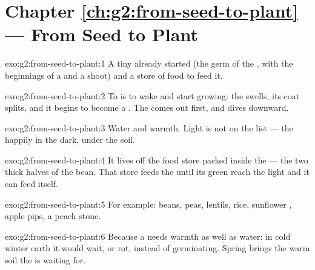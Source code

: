 \section*{Chapter \ref{ch:g2:from-seed-to-plant} --- From Seed to Plant}

\begin{solution}{exo:g2:from-seed-to-plant:1}
A tiny  already started (the germ of the , with the
beginnings of a  and a shoot) and a store of food to feed it.
\end{solution}

\begin{solution}{exo:g2:from-seed-to-plant:2}
To  is to wake and start growing: the  swells, its
coat splits, and it begins to become a . The  comes out
first, and dives downward.
\end{solution}

\begin{solution}{exo:g2:from-seed-to-plant:3}
Water and warmth. Light is not on the list --- the  
happily in the dark, under the soil.
\end{solution}

\begin{solution}{exo:g2:from-seed-to-plant:4}
It lives off the food store packed inside the  --- the two
thick halves of the bean. That store feeds the  until its
green  reach the light and it can feed itself.
\end{solution}

\begin{solution}{exo:g2:from-seed-to-plant:5}
For example: beans, peas, lentils, rice, sunflower , apple
pips, a peach stone.
\end{solution}

\begin{solution}{exo:g2:from-seed-to-plant:6}
Because a  needs warmth as well as water: in cold winter earth
it would wait, or rot, instead of germinating. Spring brings the
warm soil the  is waiting for.
\end{solution}

